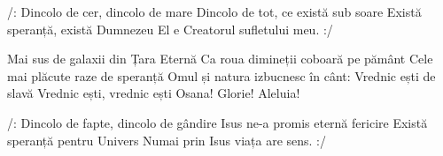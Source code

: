 
\beginverse
/: Dincolo de cer, dincolo de mare
Dincolo de tot, ce există sub soare
Există speranță, există Dumnezeu
El e Creatorul sufletului meu. :/
\endverse

\beginchorus
Mai sus de galaxii din Țara Eternă
Ca roua dimineții coboară pe pământ
Cele mai plăcute raze de speranță
Omul și natura izbucnesc în cânt:
Vrednic ești de slavă
Vrednic ești, vrednic ești
Osana! Glorie! Aleluia!
\endchorus

\beginverse
/: Dincolo de fapte, dincolo de gândire
Isus ne-a promis eternă fericire
Există speranță pentru Univers
Numai prin Isus viața are sens. :/
\endverse

\endsong